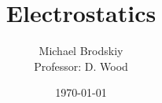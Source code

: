 


\title{Electrostatics}
\date{\today}
\author{Michael Brodskiy\\ \small Professor: D. Wood}



\maketitle

